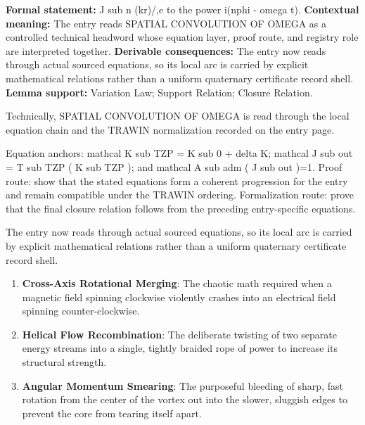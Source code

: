 \begingroup\footnotesize\setlength{\emergencystretch}{3em}\sloppy
\textbf{Formal statement:} J sub n (kr)/,e to the power i(nphi - omega t). \textbf{Contextual meaning:} The entry reads SPATIAL CONVOLUTION OF OMEGA as a controlled technical headword whose equation layer, proof route, and registry role are interpreted together. \textbf{Derivable consequences:} The entry now reads through actual sourced equations, so its local arc is carried by explicit mathematical relations rather than a uniform quaternary certificate record shell. \textbf{Lemma support:} Variation Law; Support Relation; Closure Relation.\par
\endgroup

Technically, SPATIAL CONVOLUTION OF OMEGA is read through the local equation chain and the TRAWIN normalization recorded on the entry page.

Equation anchors: mathcal K sub TZP = K sub 0 + delta K; mathcal J sub out = T sub TZP ( K sub TZP ); and mathcal A sub adm ( J sub out )=1. Proof route: show that the stated equations form a coherent progression for the entry and remain compatible under the TRAWIN ordering. Formalization route: prove that the final closure relation follows from the preceding entry-specific equations.

The entry now reads through actual sourced equations, so its local arc is carried by explicit mathematical relations rather than a uniform quaternary certificate record shell.
\endgroup

\begin{enumerate}[leftmargin=1.6em,itemsep=6pt,topsep=4pt]
\item \textbf{Cross-Axis Rotational Merging}: The chaotic math required when a magnetic field spinning clockwise violently crashes into an electrical field spinning counter-clockwise.
\item \textbf{Helical Flow Recombination}: The deliberate twisting of two separate energy streams into a single, tightly braided rope of power to increase its structural strength.
\item \textbf{Angular Momentum Smearing}: The purposeful bleeding of sharp, fast rotation from the center of the vortex out into the slower, sluggish edges to prevent the core from tearing itself apart.
\end{enumerate}

